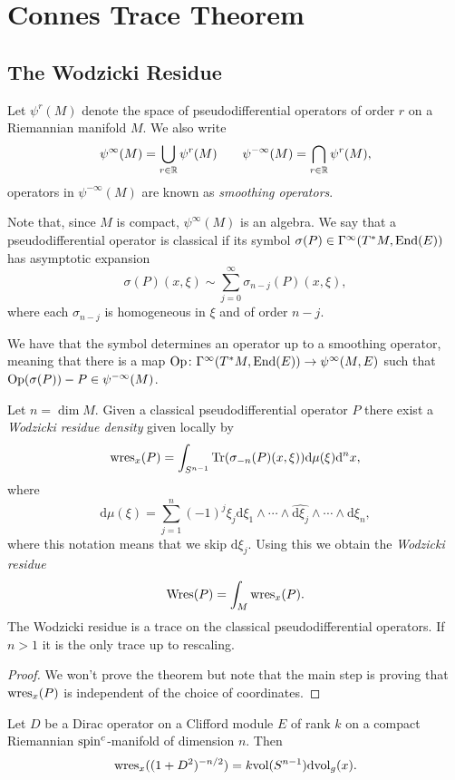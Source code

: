 \section{Connes Trace Theorem}
\subsection{The Wodzicki Residue}
Let $\psi^r(M)$ denote the space of pseudodifferential operators of order $r$ on a Riemannian manifold $M$. We also write $$\psi^\infty(M)=\bigcup_{r\in\mathbb{R}}\psi^r(M)\quad\quad\psi^{-\infty}(M)=\bigcap_{r\in\mathbb{R}}\psi^r(M),$$
operators in $\psi^{-\infty}(M)$ are known as \emph{smoothing operators}.

\noindent Note that, since $M$ is compact, $\psi^\infty(M)$ is an algebra. We say that a pseudodifferential operator is classical if its symbol $\sigma(P)\in\Gamma^\infty(T^\ast M,\mathrm{End}(E))$  has asymptotic expansion $$\sigma(P)(x,\xi)\sim\sum_{j=0}^\infty\sigma_{n-j}(P)(x,\xi),$$
where each $\sigma_{n-j}$ is homogeneous in $\xi$ and of order $n-j$.

\noindent We have that the symbol determines an operator up to a smoothing operator, meaning that there is a map $\mathrm{Op}\colon\Gamma^\infty(T^\ast M,\mathrm{End}(E))\to\psi^\infty(M,E)$ such that $\mathrm{Op}(\sigma(P))-P\in\psi^{-\infty}(M)$.

\begin{theorem}[Wodzicki]
 Let $n=\dim M$. Given a classical pseudodifferential operator $P$ there exist a \emph{Wodzicki residue density} given locally by $$\mathrm{wres}_x(P)=\int_{S^{n-1}}\mathrm{Tr}(\sigma_{-n}(P)(x,\xi))\mathrm{d}\mu(\xi)\mathrm{d}^nx,$$
 where $$\mathrm{d}\mu(\xi)=\sum_{j=1}^n(-1)^j\xi_j\mathrm{d}\xi_1\wedge\cdots\wedge\widehat{\mathrm{d}\xi_j}\wedge\cdots\wedge\mathrm{d}\xi_n,$$
 where this notation means that we skip $\mathrm{d}\xi_j$. Using this we obtain the \emph{Wodzicki residue} $$\mathrm{Wres}(P)=\int_M\mathrm{wres}_x(P).$$
 The Wodzicki residue is a trace on the classical pseudodifferential operators. If $n>1$ it is the only trace up to rescaling.
\end{theorem}
\begin{proof}
 We won't prove the theorem but note that the main step is proving that $\mathrm{wres}_x(P)$ is independent of the choice of coordinates.
\end{proof}

\begin{proposition}
 Let $D$ be a Dirac operator on a Clifford module $E$ of rank $k$ on a compact Riemannian $\mathrm{spin}^c$-manifold of dimension $n$. Then $$\mathrm{wres}_x((1+D^2)^{-n/2})=k\mathrm{vol}(S^{n-1})\mathrm{dvol}_g(x).$$
\end{proposition}

